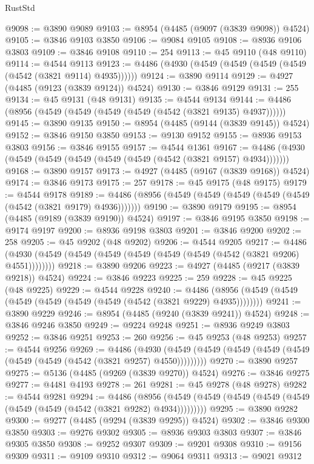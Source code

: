 \begin{lexlean}{RustStd}
\begin{coremodule}
@9098 := @3890 @9089
@9103 := @8954 (@4485 (@9097 (@3839 @9098)) @4524)
@9105 := @3846 @9103 @3850
@9106 := @9084 @9105
@9108 := @8936 @9106 @3803
@9109 := @3846 @9108
@9110 := 254
@9113 := @45 @9110 (@48 @9110)
@9114 := @4544 @9113
@9123 := @4486 (@4930 (@4549 (@4549 (@4549 (@4549 (@4542 (@3821 @9114) @4935))))))
@9124 := @3890 @9114
@9129 := @4927 (@4485 (@9123 (@3839 @9124)) @4524)
@9130 := @3846 @9129
@9131 := 255
@9134 := @45 @9131 (@48 @9131)
@9135 := @4544 @9134
@9144 := @4486 (@8956 (@4549 (@4549 (@4549 (@4549 (@4542 (@3821 @9135) @4937))))))
@9145 := @3890 @9135
@9150 := @8954 (@4485 (@9144 (@3839 @9145)) @4524)
@9152 := @3846 @9150 @3850
@9153 := @9130 @9152
@9155 := @8936 @9153 @3803
@9156 := @3846 @9155
@9157 := @4544 @1361
@9167 := @4486 (@4930 (@4549 (@4549 (@4549 (@4549 (@4549 (@4542 (@3821 @9157) @4934)))))))
@9168 := @3890 @9157
@9173 := @4927 (@4485 (@9167 (@3839 @9168)) @4524)
@9174 := @3846 @9173
@9175 := 257
@9178 := @45 @9175 (@48 @9175)
@9179 := @4544 @9178
@9189 := @4486 (@8956 (@4549 (@4549 (@4549 (@4549 (@4549 (@4542 (@3821 @9179) @4936)))))))
@9190 := @3890 @9179
@9195 := @8954 (@4485 (@9189 (@3839 @9190)) @4524)
@9197 := @3846 @9195 @3850
@9198 := @9174 @9197
@9200 := @8936 @9198 @3803
@9201 := @3846 @9200
@9202 := 258
@9205 := @45 @9202 (@48 @9202)
@9206 := @4544 @9205
@9217 := @4486 (@4930 (@4549 (@4549 (@4549 (@4549 (@4549 (@4549 (@4542 (@3821 @9206) @4551))))))))
@9218 := @3890 @9206
@9223 := @4927 (@4485 (@9217 (@3839 @9218)) @4524)
@9224 := @3846 @9223
@9225 := 259
@9228 := @45 @9225 (@48 @9225)
@9229 := @4544 @9228
@9240 := @4486 (@8956 (@4549 (@4549 (@4549 (@4549 (@4549 (@4549 (@4542 (@3821 @9229) @4935))))))))
@9241 := @3890 @9229
@9246 := @8954 (@4485 (@9240 (@3839 @9241)) @4524)
@9248 := @3846 @9246 @3850
@9249 := @9224 @9248
@9251 := @8936 @9249 @3803
@9252 := @3846 @9251
@9253 := 260
@9256 := @45 @9253 (@48 @9253)
@9257 := @4544 @9256
@9269 := @4486
    (@4930 (@4549 (@4549 (@4549 (@4549 (@4549 (@4549 (@4549 (@4542 (@3821 @9257) @4550)))))))))
@9270 := @3890 @9257
@9275 := @5136 (@4485 (@9269 (@3839 @9270)) @4524)
@9276 := @3846 @9275
@9277 := @4481 @4193
@9278 := 261
@9281 := @45 @9278 (@48 @9278)
@9282 := @4544 @9281
@9294 := @4486
    (@8956 (@4549 (@4549 (@4549 (@4549 (@4549 (@4549 (@4549 (@4542 (@3821 @9282) @4934)))))))))
@9295 := @3890 @9282
@9300 := @9277 (@4485 (@9294 (@3839 @9295)) @4524)
@9302 := @3846 @9300 @3850
@9303 := @9276 @9302
@9305 := @8936 @9303 @3803
@9307 := @3846 @9305 @3850
@9308 := @9252 @9307
@9309 := @9201 @9308
@9310 := @9156 @9309
@9311 := @9109 @9310
@9312 := @9064 @9311
@9313 := @9021 @9312

\end{coremodule}
\end{lexlean}
